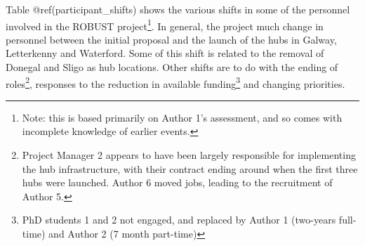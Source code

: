 \documentclass[preprint, 3p,
authoryear]{elsarticle} %
\begin{document}
Table @ref(participant\_shifts) shows the various shifts in some of the
personnel involved in the ROBUST project\footnote{Note: this is based
  primarily on Author 1's assessment, and so comes with incomplete
  knowledge of earlier events.}. In general, the project much change in
personnel between the initial proposal and the launch of the hubs in
Galway, Letterkenny and Waterford. Some of this shift is related to the
removal of Donegal and Sligo as hub locations. Other shifts are to do
with the ending of roles\footnote{Project Manager 2 appears to have been
  largely responsible for implementing the hub infrastructure, with
  their contract ending around when the first three hubs were launched.
  Author 6 moved jobs, leading to the recruitment of Author 5.},
responses to the reduction in available funding\footnote{PhD students 1
  and 2 not engaged, and replaced by Author 1 (two-years full-time) and
  Author 2 (7 month part-time)} and changing priorities.

\begingroup\fontsize{8}{10}\selectfont
\end{document}
